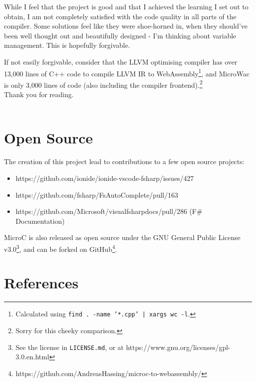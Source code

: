 \documentclass[a4paper]{article}
\begin{document}
\noindent While I feel that the project is good and that I achieved the learning I set out to obtain, I am not completely satisfied with the code quality in all parts of the compiler. Some solutions feel like they were shoe-horned in, when they should've been well thought out and beautifully designed - I'm thinking about variable management. This is hopefully forgivable.

If not easily forgivable, consider that the LLVM optimising compiler has over 13,000 lines of C++ code to compile LLVM IR to WebAssembly\footnote{Calculated using \texttt{find . -name '*.cpp' | xargs wc -l}.}, and MicroWac is only 3,000 lines of code (also including the compiler frontend).\footnote{Sorry for this cheeky comparison.}\\

\noindent Thank you for reading.\\
\\

\section{Open Source}
\noindent The creation of this project lead to contributions to a few open source projects:
\begin{itemize}
	\item https://github.com/ionide/ionide-vscode-fsharp/issues/427
	\item https://github.com/fsharp/FsAutoComplete/pull/163
	\item https://github.com/Microsoft/visualfsharpdocs/pull/286 (F\# Documentation)
\end{itemize}

\noindent MicroC is also released as open source under the GNU General Public License v3.0\footnote{See the license in \texttt{LICENSE.md}, or at https://www.gnu.org/licenses/gpl-3.0.en.html}, and can be forked on GitHub\footnote{https://github.com/AndreasHassing/microc-to-webassembly/}.

\newpage
\section{References}
\label{sec:references}
\begingroup
\renewcommand{\section}[2]{}%

{}
\endgroup
\end{document}
